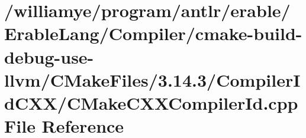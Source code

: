 \hypertarget{_compiler_2cmake-build-debug-use-llvm_2_c_make_files_23_814_83_2_compiler_id_c_x_x_2_c_make_c_x_x_compiler_id_8cpp}{}\section{/williamye/program/antlr/erable/\+Erable\+Lang/\+Compiler/cmake-\/build-\/debug-\/use-\/llvm/\+C\+Make\+Files/3.14.3/\+Compiler\+Id\+C\+X\+X/\+C\+Make\+C\+X\+X\+Compiler\+Id.cpp File Reference}
\label{_compiler_2cmake-build-debug-use-llvm_2_c_make_files_23_814_83_2_compiler_id_c_x_x_2_c_make_c_x_x_compiler_id_8cpp}
